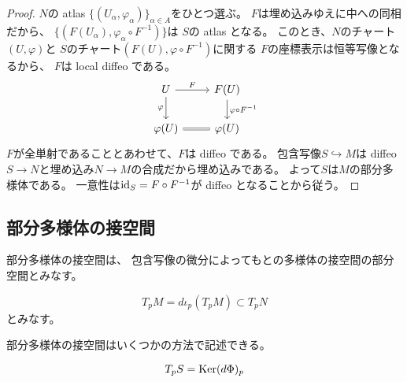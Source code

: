 \documentclass[report]{jlreq}
\begin{document}
\begin{proof}
    $N$の atlas $\{ (U_\alpha, \varphi_\alpha) \}_{\alpha \in A}$をひとつ選ぶ。
    $F$は埋め込みゆえに中への同相だから、
    $\{ (F(U_\alpha), \varphi_\alpha \circ F^{-1}) \}$は
    $S$の atlas となる。
    このとき、$N$のチャート$(U, \varphi)$と
    $S$のチャート$(F(U), \varphi \circ F^{-1})$に関する
    $F$の座標表示は恒等写像となるから、
    $F$は local diffeo である。
    \begin{equation}
        \begin{tikzcd}
            U
                \ar{r}{F}
                \ar{d}[swap]{\varphi}
                & F(U)
                    \ar{d}{\varphi \circ F^{-1}} \\
            \varphi(U)
                \ar[equal]{r}
                & \varphi(U)
        \end{tikzcd}
    \end{equation}
    $F$が全単射であることとあわせて、$F$は diffeo である。
    包含写像$S \hookrightarrow M$は
    diffeo $S \to N$と埋め込み$N \to M$の合成だから埋め込みである。
    よって$S$は$M$の部分多様体である。
    一意性は$\mathrm{id}_S = F \circ F^{-1}$が diffeo となることから従う。
\end{proof}

\begin{definition}
    \TODO{}
\end{definition}

\subsection{部分多様体の接空間}

部分多様体の接空間は、
包含写像の微分によってもとの多様体の接空間の部分空間とみなす。

\begin{definition}[部分多様体の接空間]
    \begin{equation}
        T_pM = d\iota_p(T_pM) \subset T_pN
    \end{equation}
    とみなす。
    \TODO{}
\end{definition}

部分多様体の接空間はいくつかの方法で記述できる。

\begin{proposition}
    \begin{equation}
        T_pS = \operatorname{\mathrm{Ker}} (d\Phi)_p
    \end{equation}
    \TODO{}
\end{proposition}
\end{document}
